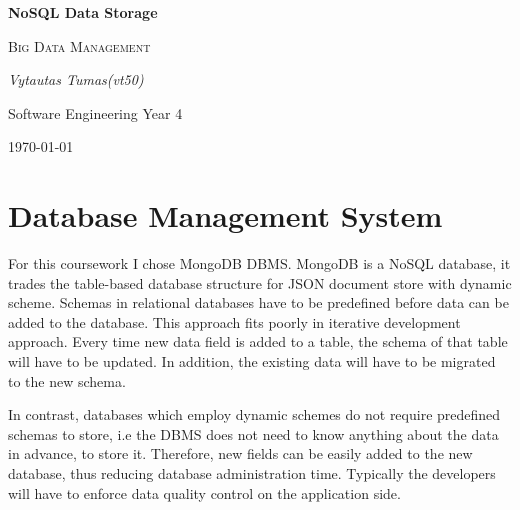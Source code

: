 \documentclass[a4paper, titlepage, 11pt]{article}
\begin{document}
\doublespacing

\author{Vytautas Tumas}
\begin{singlespace}
\begin{titlepage}
	\centering
	{\huge\bfseries NoSQL Data Storage\par}
	\vspace{1cm}
	{\scshape\LARGE Big Data Management\par}
		\vspace{1cm}

	\vspace{2cm}
	{\Large\itshape Vytautas Tumas(vt50)\par}
		{Software Engineering Year 4\par}
	\vfill

	{\large \today\par}
\end{titlepage}
\tableofcontents
\newpage
\end{singlespace}
\section{Database Management System}
For this coursework I chose MongoDB DBMS. MongoDB is a NoSQL database, it trades the table-based database structure for JSON document store with dynamic scheme. Schemas in relational databases have to be predefined before data can be added to the database. This approach fits poorly in iterative development approach. Every time new data field is added to a table, the schema of that table will have to be updated. In addition, the existing data will have to be migrated to the new schema.\par
In contrast, databases which employ dynamic schemes do not require predefined schemas to store, i.e the DBMS does not need to know anything about the data in advance, to store it. Therefore, new fields can be easily added to the new database, thus reducing database administration time. Typically the developers will have to enforce data quality control on the application side.
\end{document}
